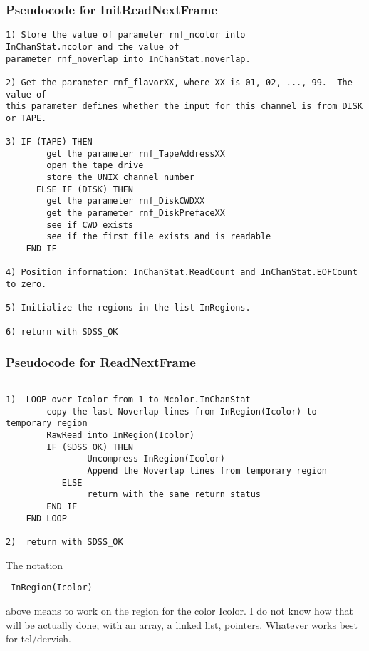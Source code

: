 \subsubsection{Pseudocode for InitReadNextFrame}
\begin{verbatim}
1) Store the value of parameter rnf_ncolor into 
InChanStat.ncolor and the value of 
parameter rnf_noverlap into InChanStat.noverlap.

2) Get the parameter rnf_flavorXX, where XX is 01, 02, ..., 99.  The value of 
this parameter defines whether the input for this channel is from DISK or TAPE.

3) IF (TAPE) THEN
        get the parameter rnf_TapeAddressXX
        open the tape drive
        store the UNIX channel number
      ELSE IF (DISK) THEN
        get the parameter rnf_DiskCWDXX
        get the parameter rnf_DiskPrefaceXX
        see if CWD exists
        see if the first file exists and is readable
    END IF

4) Position information: InChanStat.ReadCount and InChanStat.EOFCount to zero.

5) Initialize the regions in the list InRegions.

6) return with SDSS_OK
\end{verbatim}

\subsubsection{Pseudocode for ReadNextFrame}
\begin{verbatim}

1)  LOOP over Icolor from 1 to Ncolor.InChanStat
        copy the last Noverlap lines from InRegion(Icolor) to temporary region
        RawRead into InRegion(Icolor)
        IF (SDSS_OK) THEN
                Uncompress InRegion(Icolor)
                Append the Noverlap lines from temporary region
           ELSE 
                return with the same return status
        END IF
    END LOOP

2)  return with SDSS_OK

\end{verbatim}
The notation \begin{verbatim} InRegion(Icolor) \end{verbatim} above means
to work on the region for the color Icolor.  I do not know how that will
be actually done; with an array, a linked list, pointers.  Whatever works
best for tcl/dervish.

\pagebreak

